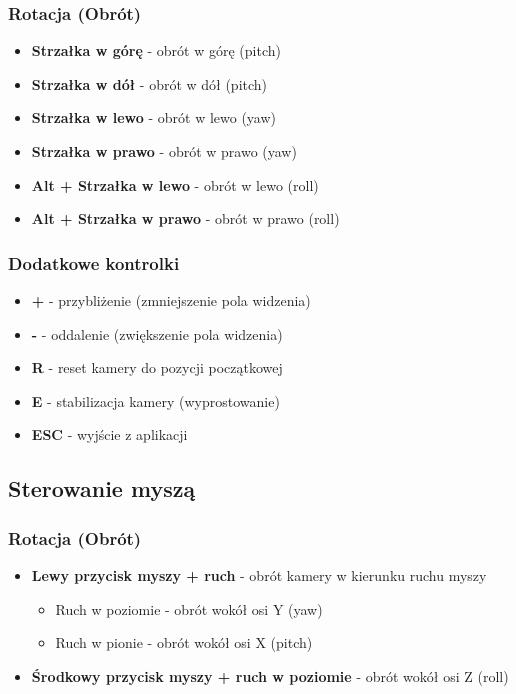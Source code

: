 \documentclass[a4paper,12pt]{article}
\begin{document}
\subsubsection{Rotacja (Obrót)}
\begin{itemize}
    \item \textbf{Strzałka w górę} - obrót w górę (pitch)
    \item \textbf{Strzałka w dół} - obrót w dół (pitch)
    \item \textbf{Strzałka w lewo} - obrót w lewo (yaw)
    \item \textbf{Strzałka w prawo} - obrót w prawo (yaw)
    \item \textbf{Alt + Strzałka w lewo} - obrót w lewo (roll)
    \item \textbf{Alt + Strzałka w prawo} - obrót w prawo (roll)
\end{itemize}

\subsubsection{Dodatkowe kontrolki}
\begin{itemize}
    \item \textbf{+} - przybliżenie (zmniejszenie pola widzenia)
    \item \textbf{-} - oddalenie (zwiększenie pola widzenia)
    \item \textbf{R} - reset kamery do pozycji początkowej
    \item \textbf{E} - stabilizacja kamery (wyprostowanie)
    \item \textbf{ESC} - wyjście z aplikacji
\end{itemize}

\subsection{Sterowanie myszą}

\subsubsection{Rotacja (Obrót)}
\begin{itemize}
    \item \textbf{Lewy przycisk myszy + ruch} - obrót kamery w kierunku ruchu myszy
    \begin{itemize}
        \item Ruch w poziomie - obrót wokół osi Y (yaw)
        \item Ruch w pionie - obrót wokół osi X (pitch)
    \end{itemize}
    \item \textbf{Środkowy przycisk myszy + ruch w poziomie} - obrót wokół osi Z (roll)
\end{itemize}
\end{document}
